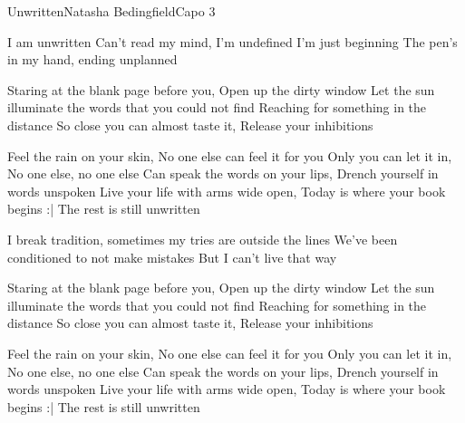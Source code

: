 \begin{song}{Unwritten}{Natasha Bedingfield}{Capo 3}

I am unwritten
Can't read my mind, I'm undefined
I'm just beginning
The pen's in my hand, ending unplanned

Staring at the blank page before you, Open up the dirty window
Let the sun illuminate the words that you could not find
Reaching for something in the distance
So close you can almost taste it, Release your inhibitions

Feel the rain on your skin, No one else can feel it for you
Only you can let it in, No one else, no one else
Can speak the words on your lips, Drench yourself in words unspoken
Live your life with arms wide open, Today is where your book begins :|
The rest is still unwritten

I break tradition,
sometimes my tries are outside the lines
We've been conditioned to not make mistakes
But I can't live that way

Staring at the blank page before you, Open up the dirty window
Let the sun illuminate the words that you could not find
Reaching for something in the distance
So close you can almost taste it, Release your inhibitions



Feel the rain on your skin, No one else can feel it for you
Only you can let it in, No one else, no one else
Can speak the words on your lips, Drench yourself in words unspoken
Live your life with arms wide open, Today is where your book begins :|
The rest is still unwritten


\end{song}
